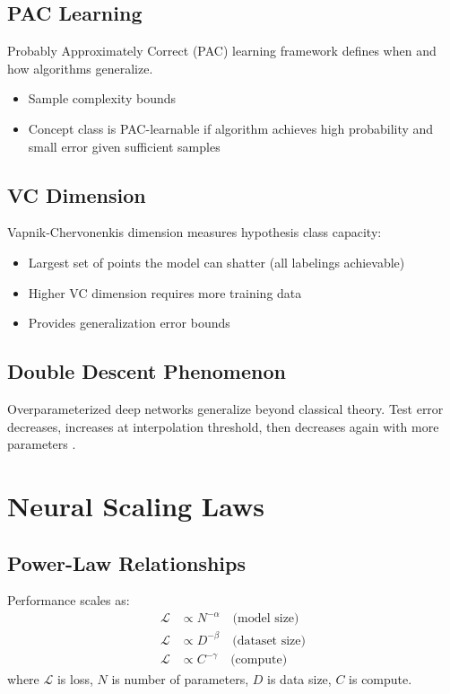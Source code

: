 \subsection{PAC Learning}
Probably Approximately Correct (PAC) learning framework defines when and how algorithms generalize.

\begin{itemize}
    \item Sample complexity bounds
    \item Concept class is PAC-learnable if algorithm achieves high probability and small error given sufficient samples
\end{itemize}

\subsection{VC Dimension}
Vapnik-Chervonenkis dimension measures hypothesis class capacity:
\begin{itemize}
    \item Largest set of points the model can shatter (all labelings achievable)
    \item Higher VC dimension requires more training data
    \item Provides generalization error bounds
\end{itemize}

\subsection{Double Descent Phenomenon}
Overparameterized deep networks generalize beyond classical theory. Test error decreases, increases at interpolation threshold, then decreases again with more parameters \cite{zhang2017,belkin2019}.

\section{Neural Scaling Laws}

\subsection{Power-Law Relationships}
Performance scales as:
\begin{align}
\mathcal{L} &\propto N^{-\alpha} \quad \text{(model size)} \\
\mathcal{L} &\propto D^{-\beta} \quad \text{(dataset size)} \\
\mathcal{L} &\propto C^{-\gamma} \quad \text{(compute)}
\end{align}
where $\mathcal{L}$ is loss, $N$ is number of parameters, $D$ is data size, $C$ is compute.

